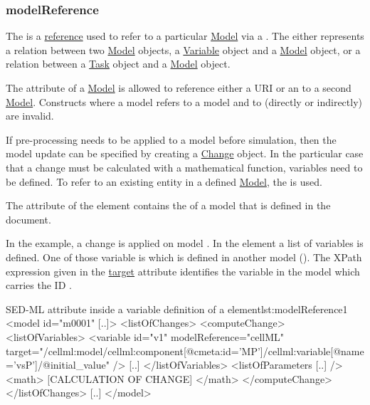 \subsubsection{modelReference}
\label{sec:modelReference}
The  is a \hyperref[sec:reference]{reference} used to refer to a particular \hyperref[class:model]{Model} via a \hyperref[type:sidref]{}. The  either represents a relation between two \hyperref[class:model]{Model} objects, a \hyperref[class:variable]{Variable} object and a \hyperref[class:model]{Model} object, or a relation between a \hyperref[class:task]{Task} object and a \hyperref[class:model]{Model} object.

The  attribute of a \hyperref[class:model]{Model} is allowed to reference either a URI or an  to a second \hyperref[class:model]{Model}. Constructs where a model  refers to a model  and  to  (directly or indirectly) are invalid.

If pre-processing needs to be applied to a model before simulation, then the model update can be specified by creating a \hyperref[class:change]{Change} object. In the particular case that a change must be calculated with a mathematical function, variables need to be defined. To refer to an existing entity in a defined \hyperref[class:model]{Model}, the  is used. 

The  attribute of the  element contains the  of a model that is defined in the document. 

In the example, a change is  applied on model . In the  element a list of variables is defined. One of those variable is  which is defined in another model (). The XPath expression given in the \hyperref[sec:target]{target} attribute identifies the variable in the model which carries the ID .
\begin{myXmlLst}{SED-ML  attribute inside a variable definition of a  element}{lst:modelReference1}
<model id="m0001" [..]>
	<listOfChanges>
		<computeChange>
			<listOfVariables>
				<variable id="v1" modelReference="cellML" target="/cellml:model/cellml:component[@cmeta:id='MP']/cellml:variable[@name='vsP']/@initial_value" />
     			[..]
			</listOfVariables>
			<listOfParameters [..] />
    			<math>
     			[CALCULATION OF CHANGE]
    			</math>
   		</computeChange>
	</listOfChanges>
	[..]
</model>
\end{myXmlLst}

